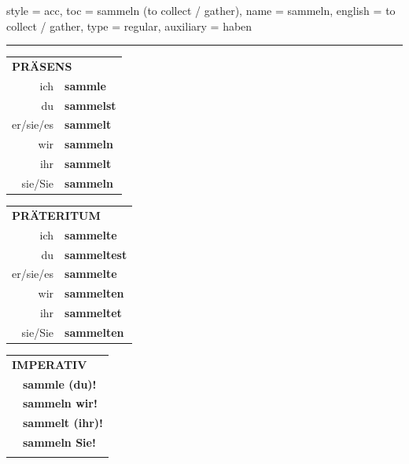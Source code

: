 \begin{verbentry}{
  style = {acc},
  toc = {sammeln (to collect / gather)},
  name = {sammeln},
  english = {to collect / gather},
  type = {regular},
  auxiliary = {haben}
}
 
    
     \vspace{5pt}

    \hrule
    
    \vspace{5pt}

  \begin{tabular}{rl}
     \multicolumn{2}{l}{\textbf{PRÄSENS} }\\
    ich & \textbf{sammle}\\
    du & \textbf{sammelst}\\
    er/sie/es & \textbf{sammelt}\\
    wir & \textbf{sammeln}\\
    ihr & \textbf{sammelt}\\
    sie/Sie & \textbf{sammeln}\\
  \end{tabular}
  \hfill
  \begin{tabular}{rl}
    \multicolumn{2}{l}{\textbf{PRÄTERITUM} }\\
    ich & \textbf{sammelte}\\
    du & \textbf{sammeltest}\\
    er/sie/es & \textbf{sammelte}\\
    wir & \textbf{sammelten}\\
    ihr & \textbf{sammeltet}\\
    sie/Sie & \textbf{sammelten}\\
  \end{tabular}
  \hfill
  \begin{tabular}{rl}
     \multicolumn{2}{l}{\textbf{IMPERATIV} }\\
   & \textbf{sammle (du)!}\\
   & \textbf{sammeln wir!}\\
   & \textbf{sammelt (ihr)!}\\
   & \textbf{sammeln Sie!}\\
   & \vspace{10pt}
  \end{tabular}

 \vspace{10pt}


\end{verbentry}
